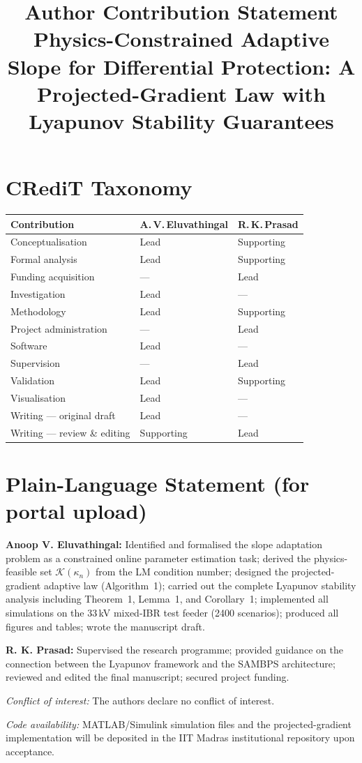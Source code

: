 \documentclass[11pt,a4paper]{article}
\title{\textbf{Author Contribution Statement}\\[4pt]
       \large Physics-Constrained Adaptive Slope for Differential Protection:
       A Projected-Gradient Law with Lyapunov Stability Guarantees}
\author{}
\date{}
\begin{document}
\maketitle\thispagestyle{empty}

\section*{CRediT Taxonomy}

\noindent
\begin{tabular}{@{}p{5.8cm} p{3.0cm} p{3.0cm}@{}}
\toprule
\textbf{Contribution} & \textbf{A.\,V.\,Eluvathingal} & \textbf{R.\,K.\,Prasad} \\
\midrule
Conceptualisation          & Lead   & Supporting \\
Formal analysis            & Lead   & Supporting \\
Funding acquisition        & ---    & Lead       \\
Investigation              & Lead   & ---        \\
Methodology                & Lead   & Supporting \\
Project administration     & ---    & Lead       \\
Software                   & Lead   & ---        \\
Supervision                & ---    & Lead       \\
Validation                 & Lead   & Supporting \\
Visualisation              & Lead   & ---        \\
Writing --- original draft & Lead   & ---        \\
Writing --- review \& editing & Supporting & Lead \\
\bottomrule
\end{tabular}

\bigskip

\section*{Plain-Language Statement (for portal upload)}

\textbf{Anoop V. Eluvathingal:} Identified and formalised the slope
adaptation problem as a constrained online parameter estimation task;
derived the physics-feasible set $\mathcal{K}(\kappa_n)$ from the
LM condition number; designed the projected-gradient adaptive law
(Algorithm~1); carried out the complete Lyapunov stability analysis
including Theorem~1, Lemma~1, and Corollary~1; implemented all
simulations on the 33\,kV mixed-IBR test feeder (2400 scenarios);
produced all figures and tables; wrote the manuscript draft.

\textbf{R. K. Prasad:} Supervised the research programme; provided
guidance on the connection between the Lyapunov framework and the
SAMBPS architecture; reviewed and edited the final manuscript;
secured project funding.

\bigskip
\noindent\textit{Conflict of interest:} The authors declare no conflict
of interest.

\bigskip
\noindent\textit{Code availability:} MATLAB/Simulink simulation
files and the projected-gradient implementation will be deposited in
the IIT Madras institutional repository upon acceptance.
\end{document}

